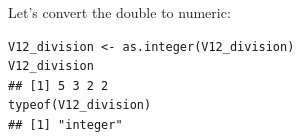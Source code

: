 \documentclass[12pt]{book}
\begin{document}
Let’s convert the double to numeric:
\begin{verbatim}
V12_division <- as.integer(V12_division)
V12_division
## [1] 5 3 2 2
typeof(V12_division)
## [1] "integer"
\end{verbatim}







%
%
%
%
%
%
%
%
%
%
\end{document}
